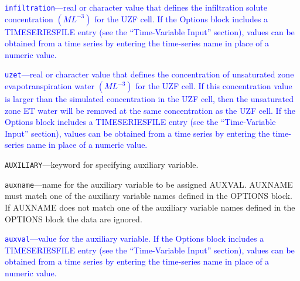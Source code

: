 \begin{description}
\item \textcolor{blue}{\texttt{infiltration}---real or character value that defines the infiltration solute concentration $(ML^{-3})$ for the UZF cell. If the Options block includes a TIMESERIESFILE entry (see the ``Time-Variable Input'' section), values can be obtained from a time series by entering the time-series name in place of a numeric value.}

\item \textcolor{blue}{\texttt{uzet}---real or character value that defines the concentration of unsaturated zone evapotranspiration water $(ML^{-3})$ for the UZF cell. If this concentration value is larger than the simulated concentration in the UZF cell, then the unsaturated zone ET water will be removed at the same concentration as the UZF cell.  If the Options block includes a TIMESERIESFILE entry (see the ``Time-Variable Input'' section), values can be obtained from a time series by entering the time-series name in place of a numeric value.}

\item \texttt{AUXILIARY}---keyword for specifying auxiliary variable.

\item \texttt{auxname}---name for the auxiliary variable to be assigned AUXVAL.  AUXNAME must match one of the auxiliary variable names defined in the OPTIONS block. If AUXNAME does not match one of the auxiliary variable names defined in the OPTIONS block the data are ignored.

\item \textcolor{blue}{\texttt{auxval}---value for the auxiliary variable. If the Options block includes a TIMESERIESFILE entry (see the ``Time-Variable Input'' section), values can be obtained from a time series by entering the time-series name in place of a numeric value.}

\end{description}

